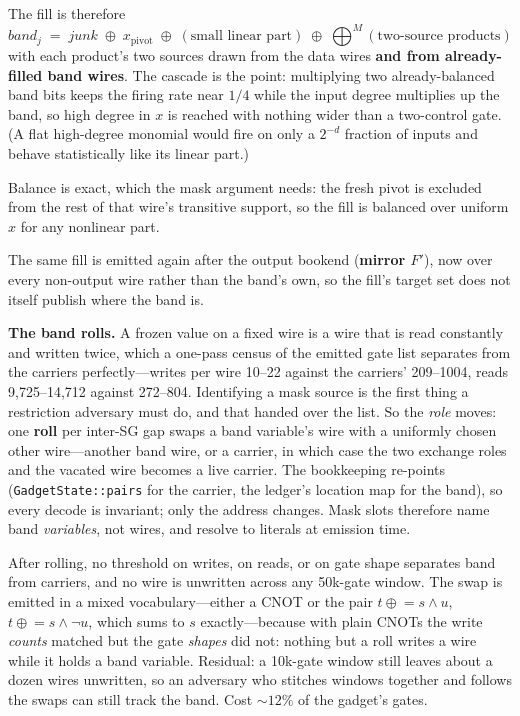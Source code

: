 \documentclass[11pt]{article}
\newcommand{\xor}{\oplus}
\begin{document}
The fill is therefore
\[
\mathit{band}_j \;=\; \mathit{junk}\;\xor\;x_{\mathrm{pivot}}\;\xor\;(\text{small linear part})\;\xor\;\bigoplus\nolimits^{M}(\text{two-source products})
\]
with each product's two sources drawn from the data wires \textbf{and from
already-filled band wires}. The cascade is the point: multiplying two
already-balanced band bits keeps the firing rate near $1/4$ while the input
degree multiplies up the band, so high degree in $x$ is reached with nothing
wider than a two-control gate. (A flat high-degree monomial would fire on only a
$2^{-d}$ fraction of inputs and behave statistically like its linear part.)

Balance is exact, which the mask argument needs: the fresh pivot is excluded
from the rest of that wire's transitive support, so the fill is balanced over
uniform $x$ for any nonlinear part.

The same fill is emitted again after the output bookend (\textbf{mirror $F'$}),
now over every non-output wire rather than the band's own, so the fill's target
set does not itself publish where the band is.

\textbf{The band rolls.} A frozen value on a fixed wire is a wire that is read
constantly and written twice, which a one-pass census of the emitted gate list
separates from the carriers perfectly---writes per wire 10--22 against the
carriers' 209--1004, reads 9{,}725--14{,}712 against 272--804. Identifying a mask
source is the first thing a restriction adversary must do, and that handed over
the list. So the \emph{role} moves: one \textbf{roll} per inter-SG gap swaps a
band variable's wire with a uniformly chosen other wire---another band wire, or a
carrier, in which case the two exchange roles and the vacated wire becomes a live
carrier. The bookkeeping re-points (\texttt{GadgetState::pairs} for the carrier,
the ledger's location map for the band), so every decode is invariant; only the
address changes. Mask slots therefore name band \emph{variables}, not wires, and
resolve to literals at emission time.

After rolling, no threshold on writes, on reads, or on gate shape separates band
from carriers, and no wire is unwritten across any 50k-gate window. The swap is
emitted in a mixed vocabulary---either a CNOT or the pair
$t \mathrel{\xor}= s \wedge u$, $t \mathrel{\xor}= s \wedge \neg u$, which sums
to $s$ exactly---because with plain CNOTs the write \emph{counts} matched but the
gate \emph{shapes} did not: nothing but a roll writes a wire while it holds a
band variable. Residual: a 10k-gate window still leaves about a dozen wires
unwritten, so an adversary who stitches windows together and follows the swaps
can still track the band. Cost ${\sim}12\%$ of the gadget's gates.
\end{document}
